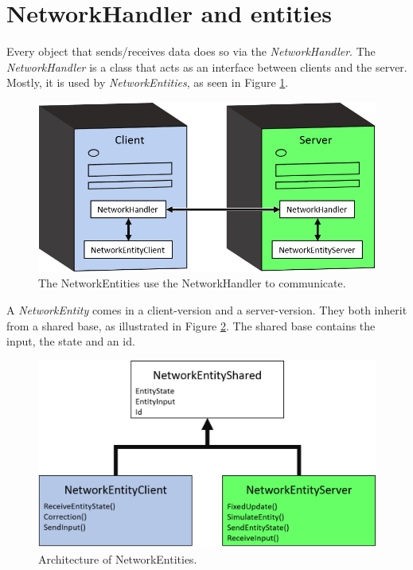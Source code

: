 \section{NetworkHandler and entities}
Every object that sends/receives data does so via the \emph{NetworkHandler}.
The \emph{NetworkHandler} is a class that acts as an interface between clients and the server.
Mostly, it is used by \emph{NetworkEntities}, as seen in Figure \ref{fig:networkHandler}.

\begin{figure}[H]
\centering
\includegraphics[scale=1]{figures/network/networkHandler}
\caption{The NetworkEntities use the NetworkHandler to communicate.}
\label{fig:networkHandler}
\end{figure}

A \emph{NetworkEntity} comes in a client-version and a server-version.
They both inherit from a shared base, as illustrated in Figure \ref{fig:networkEntity}.
The shared base contains the input, the state and an id.

\begin{figure}[H]
\centering
\includegraphics[scale=0.6]{figures/network/networkEntity}
\caption{Architecture of NetworkEntities.}
\label{fig:networkEntity}
\end{figure}

